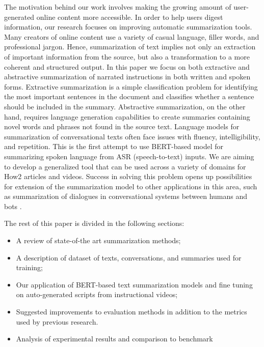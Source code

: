 \documentclass[sigconf]{acmart}
\begin{document}
The motivation behind our work involves making the growing amount of user-generated online content more accessible. In order to help  users digest information, our research focuses on improving automatic summarization tools. Many creators of online content use a variety of casual language, filler words, and professional jargon. Hence, summarization of text implies not only an extraction of important information from the source, but also a transformation to a more coherent and structured output. In this paper we focus on both extractive and abstractive summarization of narrated instructions in both written and spoken forms. Extractive summarization is a simple classification problem for identifying the most important sentences in the document and classifies whether a sentence should be included in the summary. Abstractive summarization, on the other hand, requires language generation capabilities to create summaries containing novel words and phrases not found in the source text. Language models for summarization of conversational texts often face issues with fluency, intelligibility, and repetition. This is the first attempt to use BERT-based  model for summarizing  spoken language from ASR (speech-to-text) inputs.  We are aiming to develop a generalized tool that can be used across a variety of domains for How2 articles and videos. Success in solving this problem opens up possibilities for extension of the summarization model to other applications in this area, such as summarization of dialogues in conversational systems between humans and bots \cite{liu2019}. 

The rest of this paper is divided in the following sections:
\begin{itemize}
\item A review of state-of-the art summarization methods;
\item A description of dataset of texts, conversations, and summaries used for training;
\item Our application of BERT-based text summarization models \cite{inproceedings} and fine tuning on auto-generated scripts from instructional videos; 
\item Suggested improvements to evaluation methods in addition to the metrics \cite{10.3115/1118162.1118168} used by previous research.
\item Analysis of experimental results and comparison to benchmark
\end{itemize}
\end{document}
